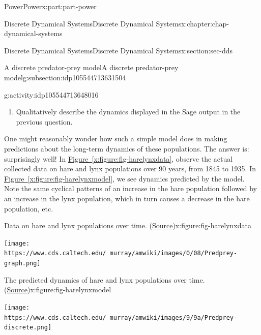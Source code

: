 \documentclass[oneside,10pt,]{book}
\newcommand{\xreffont}{\relax}
\numberwithin{equation}{section}
\begin{document}
\begin{partptx}{Power}{}{Power}{}{}{x:part:part-power}
\begin{chapterptx}{Discrete Dynamical Systems}{}{Discrete Dynamical Systems}{}{}{x:chapter:chap-dynamical-systems}
\begin{sectionptx}{Discrete Dynamical Systems}{}{Discrete Dynamical Systems}{}{}{x:section:sec-dds}
\begin{subsectionptx}{A discrete predator-prey model}{}{A discrete predator-prey model}{}{}{g:subsection:idp105544713631504}
\begin{activity}{}{g:activity:idp105544713648016}
\begin{enumerate}
\begin{sageinput}
def L(n):
	if n==0:
		return L_0
	else:
		return L(n-1) + (c*L(n-1)*H(n-1)-d*L(n-1))/nperiod
time=10
nn=range(time)
HH = [H(n) for n in nn]
LL = [L(n) for n in nn]
nH = list(zip(nn, HH))
nL = list(zip(nn, LL))
H_dots = points(nH, color='blue')
L_dots = points(nL, color='red')
p = H_dots + L_dots
p
\end{sageinput}
%
\item{}Qualitatively describe the dynamics displayed in the Sage output in the previous question.%
\end{enumerate}
\end{activity}%
%
%
One might reasonably wonder how such a simple model does in making predictions about the long-term dynamics of these populations. The answer is: surprisingly well! In \hyperref[x:figure:fig-harelynxdata]{Figure~{\xreffont\ref{x:figure:fig-harelynxdata}}}, observe the actual collected data on hare and lynx populations over 90 years, from 1845 to 1935. In \hyperref[x:figure:fig-harelynxmodel]{Figure~{\xreffont\ref{x:figure:fig-harelynxmodel}}}, we see dynamics predicted by the model. Note the same cyclical patterns of an increase in the hare population followed by an increase in the lynx population, which in turn causes a decrease in the hare population, etc.%
\begin{figureptx}{Data on hare and lynx populations over time. (\href{https://www.cds.caltech.edu/\~murray/amwiki/index.php/Predator_prey}{Source}\protect\footnotemark{})}{x:figure:fig-harelynxdata}{}%
\begin{image}{0.25}{0.5}{0.25}%
\texttt{[image: https://www.cds.caltech.edu/~murray/amwiki/images/0/08/Predprey-graph.png]}
\end{image}%
\tcblower
\end{figureptx}%
%
\begin{figureptx}{The predicted dynamics of hare and lynx populations over time. (\href{https://www.cds.caltech.edu/\~murray/amwiki/index.php/Predator_prey}{Source}\protect\footnotemark{})}{x:figure:fig-harelynxmodel}{}%
\begin{image}{0.25}{0.5}{0.25}%
\texttt{[image: https://www.cds.caltech.edu/~murray/amwiki/images/9/9a/Predprey-discrete.png]}

\end{image}
\end{figureptx}
\end{subsectionptx}
\end{sectionptx}
\end{chapterptx}
\end{partptx}
\end{document}

